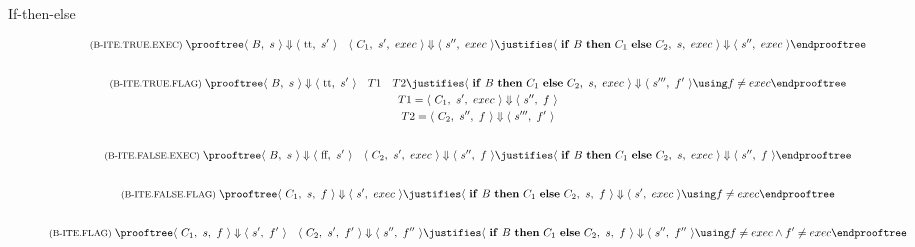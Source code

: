 \begin{description}
\item[If-then-else]
\begin{gather*}
  \rulename{B-ITE.TRUE.EXEC}
  \prooftree
    \config{B}{s} \Downarrow \config{\textrm{tt}}{s'}
      \quad 
      \configG{C_1}{s'}{exec} \Downarrow \config{s''}{exec}
    \justifies
      \configG{\textrm{$\kw{if}$ $B$ $\kw{then}$ $C_1$ $\kw{else}$ $C_2$}}{s}{exec} \Downarrow \config{s''}{exec}
  \endprooftree
  \\[2em]
  \rulename{B-ITE.TRUE.FLAG}
  \prooftree
    \config{B}{s} \Downarrow \config{\textrm{tt}}{s'}
      \quad 
      T1
      \quad
      T2
    \justifies
      \configG{\textrm{$\kw{if}$ $B$ $\kw{then}$ $C_1$ $\kw{else}$ $C_2$}}{s}{exec} \Downarrow \config{s'''}{f'}
    \using f \neq exec
  \endprooftree
  \\
  T1 = \configG{C_1}{s'}{exec} \Downarrow \config{s''}{f}\\
  T2 = \configG{C_2}{s''}{f} \Downarrow \config{s'''}{f'}
  \\[2em]
  \rulename{B-ITE.FALSE.EXEC}
  \prooftree
    \config{B}{s} \Downarrow \config{\textrm{ff}}{s'}
      \quad 
      \configG{C_2}{s'}{exec} \Downarrow \config{s''}{f}
    \justifies
      \configG{\textrm{$\kw{if}$ $B$ $\kw{then}$ $C_1$ $\kw{else}$ $C_2$}}{s}{exec} \Downarrow \config{s''}{f}
  \endprooftree
  \\[2em]
  \rulename{B-ITE.FALSE.FLAG}
  \prooftree
      \configG{C_1}{s}{f} \Downarrow \config{s'}{exec}
    \justifies
      \configG{\textrm{$\kw{if}$ $B$ $\kw{then}$ $C_1$ $\kw{else}$ $C_2$}}{s}{f} \Downarrow \config{s'}{exec}
    \using f \neq exec
  \endprooftree
  \\[2em]
  \rulename{B-ITE.FLAG}
  \prooftree
      \configG{C_1}{s}{f} \Downarrow \config{s'}{f'}
      \quad
      \configG{C_2}{s'}{f'} \Downarrow \config{s''}{f''}
    \justifies
      \configG{\textrm{$\kw{if}$ $B$ $\kw{then}$ $C_1$ $\kw{else}$ $C_2$}}{s}{f} \Downarrow \config{s''}{f''}
    \using f \neq exec \land f' \neq exec
  \endprooftree
\end{gather*}


\end{description}
